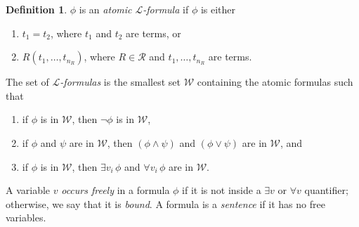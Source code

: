 \documentclass{amsart}
\theoremstyle{definition}
\newtheorem{definition}[theorem]{Definition}
\numberwithin{equation}{section}
\begin{document}
\begin{definition}
    $\phi$ is an \emph{atomic $\mathcal{L}$-formula} if $\phi$ is either
    \begin{enumerate}[label= {\roman*)}]
        \item $t_1 = t_2$, where $t_1$ and $t_2$ are terms, or
        \item $R(t_1,\dots,t_{n_R})$, where $R \in \mathcal{R}$ and $t_1,\dots,t_{n_R}$ are terms.
    \end{enumerate}
    The set of \emph{$\mathcal{L}$-formulas} is the smallest set $\mathcal{W}$ containing the atomic formulas such that 
    \begin{enumerate}[label= {\roman*)}]
        \item if $\phi$ is in $\mathcal{W}$, then $\neg\phi$ is in $\mathcal{W}$,
        \item if $\phi$ and $\psi$ are in $\mathcal{W}$, then $(\phi \land \psi)$ and $(\phi \lor \psi)$ are in $\mathcal{W}$, and 
        \item if $\phi$ is in $\mathcal{W}$, then $\exists v_i\, \phi$ and $\forall v_i\, \phi$ are in $\mathcal{W}$.
    \end{enumerate}
\end{definition}

A variable $v$ \emph{occurs freely} in a formula $\phi$
if it is not inside a $\exists v$ or $\forall v$ quantifier;
otherwise, we say that it is \emph{bound}.
A formula is a \emph{sentence} if it has no free variables.
\end{document}
